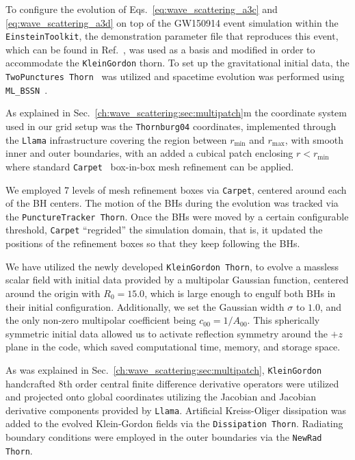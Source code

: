 To configure the evolution of Eqs.~\eqref{eq:wave_scattering_a3c} and \eqref{eq:wave_scattering_a3d} on top of the GW150914 event simulation within the \texttt{EinsteinToolkit}, the demonstration parameter file that reproduces this event, which can be found in Ref.~\cite{GW150914Demo}, was used as a basis and modified in order to accommodate the \texttt{KleinGordon} thorn. To set up the gravitational initial data, the \texttt{TwoPunctures Thorn}~\cite{Ansorg:2004ds} was utilized and spacetime evolution was performed using \texttt{ML\_BSSN}~\cite{Brown:2008sb,Kranc:web,McLachlan:web}.

As explained in Sec.~\ref{ch:wave_scattering:sec:multipatch}m the coordinate system used in our grid setup was the \texttt{Thornburg04} coordinates, implemented through the \texttt{Llama} infrastructure covering the region between $r_\text{min}$ and $r_\text{max}$, with smooth inner and outer boundaries, with an added a cubical patch enclosing $r < r_\text{min}$ where standard \texttt{Carpet}~\cite{Schnetter:2003rb} box-in-box mesh refinement can be applied.

We employed 7 levels of mesh refinement boxes via \texttt{Carpet}, centered around each of the \ac{BH} centers. The motion of the \acp{BH} during the evolution was tracked via the \texttt{PunctureTracker Thorn}. Once the \acp{BH} were moved by a certain configurable threshold, \texttt{Carpet} ``regrided'' the simulation domain, that is, it updated the positions of the refinement boxes so that they keep following the \acp{BH}.

We have utilized the newly developed \texttt{KleinGordon Thorn}, to evolve a massless scalar field with initial data provided by a multipolar Gaussian function, centered around the origin with $R_0 = 15.0$, which is large enough to engulf both \acp{BH} in their initial configuration. Additionally, we set the Gaussian width $\sigma$ to $1.0$, and the only non-zero multipolar coefficient being $c_{00} = 1 / A_{00}$. This spherically symmetric initial data allowed us to activate reflection symmetry around the $+z$ plane in the code, which saved computational time, memory, and storage space.

As was explained in Sec.~\ref{ch:wave_scattering:sec:multipatch}, \texttt{KleinGordon} handcrafted 8th order central finite difference derivative operators were utilized and projected onto global coordinates utilizing the Jacobian and Jacobian derivative components provided by \texttt{Llama}. Artificial Kreiss-Oliger dissipation was added to the evolved Klein-Gordon fields via the \texttt{Dissipation Thorn}. Radiating boundary conditions were employed in the outer boundaries via the \texttt{NewRad Thorn}.

